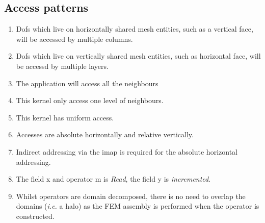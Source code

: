 \documentclass{report}
\begin{document}
\subsection{Access patterns}
\begin{enumerate}
 \item Dofs which live on horizontally shared mesh entities, such as a
       vertical face, will be accessed by multiple columns.
     \item Dofs which live on vertically shared mesh entities, such as
       horizontal face, will be accessd by multiple layers.
     \item The application will access all the neighbours
     \item This kernel only access one level of neighbours.
     \item This kernel has uniform access.
     \item Accesses are absolute horizontally and relative vertically.
     \item Indirect addressing via the imap is required for the
       absolute horizontal addressing.
     \item The field x and operator m is {\em Read}, the field y is {\em incremented}.
     \item Whilst operators are domain decomposed, there is no need to overlap the domains ({\em i.e.} a halo) as the FEM assembly is performed when the operator is constructed.
\end{enumerate}
\end{document}
